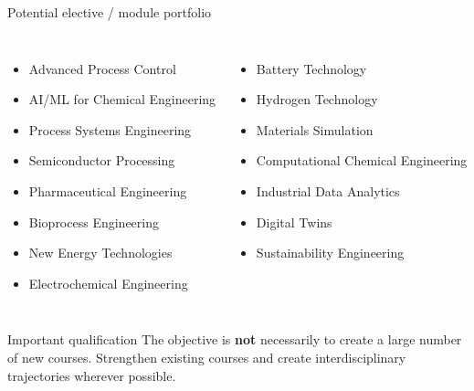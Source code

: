 \documentclass[aspectratio=169,11pt]{beamer}
\newcommand{\key}[1]{\textbf{\color{IITblue}#1}}
\begin{document}
\begin{frame}{Potential elective / module portfolio}
\begin{columns}[T]
\begin{itemize}
\item Advanced Process Control
\item AI/ML for Chemical Engineering
\item Process Systems Engineering
\item Semiconductor Processing
\item Pharmaceutical Engineering
\item Bioprocess Engineering
\item New Energy Technologies
\item Electrochemical Engineering
\end{itemize}
\begin{itemize}
\item Battery Technology
\item Hydrogen Technology
\item Materials Simulation
\item Computational Chemical Engineering
\item Industrial Data Analytics
\item Digital Twins
\item Sustainability Engineering
\end{itemize}
\end{columns}
\vspace{4mm}
\begin{alertblock}{Important qualification}
The objective is \key{not} necessarily to create a large number of new courses. Strengthen existing courses and create interdisciplinary trajectories wherever possible.
\end{alertblock}
\end{frame}
\end{document}
